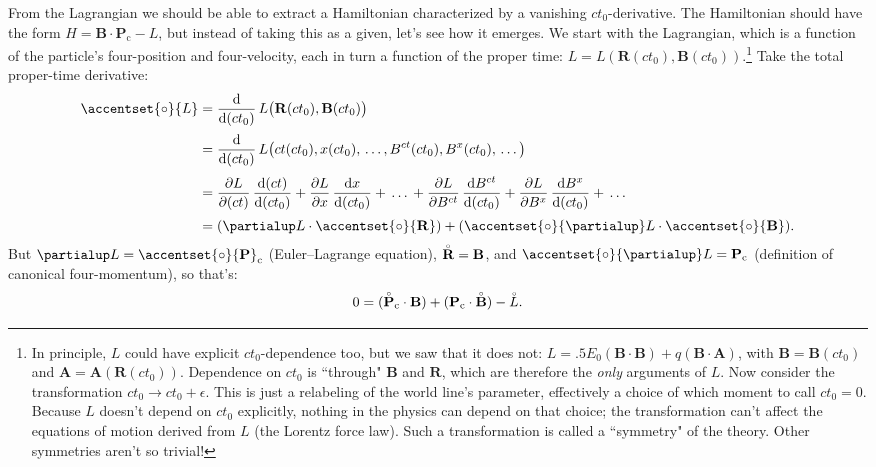 \documentclass[12pt]{article}
\renewcommand{\mathring}[1]{\accentset{\circ}{#1}}
\renewcommand{\vv}[1]{\mathbf{#1}}
\newcommand{\dd}[1]{\mathrm{d}#1}
\begin{document}
From the Lagrangian we should be able to extract a Hamiltonian characterized by a vanishing $ct_0$-derivative. The Hamiltonian should have the form $H = \vv B \cdot \vv P_\mathrm{c} - L$, but instead of taking this as a given, let's see how it emerges. We start with the Lagrangian, which is a function of the particle's four-position and four-velocity, each in turn a function of the proper time: $L = L (\vv R (ct_0), \vv B (ct_0))$.\footnote{\label{fn:hamiltonian}In principle, $L$ could have explicit $ct_0$-dependence too, but we saw that it does not: ${L = .5 E_0 (\vv B \cdot \vv B) + q (\vv B \cdot \vv A)}$, with $\vv B = \vv B (ct_0)$ and $\vv A = \vv A (\vv R (ct_0))$. Dependence on $ct_0$ is ``through" $\vv B$ and $\vv R$, which are therefore the \emph{only} arguments of $L$. Now consider the transformation $ct_0 \rightarrow ct_0 + \epsilon$. This is just a relabeling of the world line's parameter, effectively a choice of which moment to call $ct_0 = 0$. Because $L$ doesn't depend on $ct_0$ explicitly, nothing in the physics can depend on that choice; the transformation can't affect the equations of motion derived from $L$ (the Lorentz force law). Such a transformation is called a ``symmetry" of the theory. Other symmetries aren't so trivial!} Take the total proper-time derivative:
\begin{equation*}
\begin{split}
\mathring{L} &= \dfrac{\dd}{\dd (ct_0)} \, L \big( \vv R (ct_0), \vv B (ct_0) \big) \\[2pt]
&= \dfrac{\dd}{\dd (ct_0)} \, L \big( ct (ct_0), x (ct_0), \, \dots , B^{ct} (ct_0), B^x (ct_0), \, \dots \big) \\[3pt]
&= \dfrac{\partial L}{\partial (ct)} \, \dfrac{\dd (ct)}{\dd (ct_0)} + \dfrac{\partial L}{\partial x} \, \dfrac{\dd x}{\dd (ct_0)} + \, \dots \, + \dfrac{\partial L}{\partial B^{ct}} \, \dfrac{\dd B^{ct}}{\dd (ct_0)} + \dfrac{\partial L}{\partial B^x} \, \dfrac{\dd B^x}{\dd (ct_0)} + \, \dots \\[2pt]
&= ( \partialup L \cdot \mathring{\vv R}) + (\mathring{\partialup} L \cdot \mathring{\vv B}) .
\end{split}
\end{equation*}
But $\partialup L = \mathring{\vv P}_\textrm{c}$ (Euler--Lagrange equation), $\mathring{\vv R} = \vv B$, and $\mathring{\partialup} L = \vv P_\mathrm{c}$ (definition of canonical four-momentum), so that's:
\begin{equation*}
0 = (\mathring{\vv P}_\textrm{c} \cdot \vv B) + (\vv P_\mathrm{c} \cdot \mathring{\vv B}) - \mathring{L} .
\end{equation*}
\end{document}
